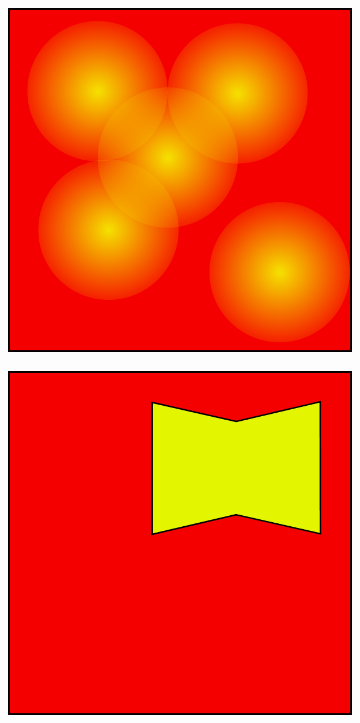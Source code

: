 \begin{figure}[t]
\begin{subfigure}[b]{0.2\textwidth}
      \caption{}
      \label{fig:one-direction-one-candidate}
  \end{subfigure}
  \hfill
  \begin{subfigure}[b]{0.2\textwidth}
      \centering
      \includegraphics[width=\textwidth]{papers/swarm-intelligence2021/img/scenario/standard-overlay.pdf}
      \caption{}
      \label{fig:overlapped}
  \end{subfigure}
  \hfill
  \begin{subfigure}[b]{0.2\textwidth}
      \centering
      \includegraphics[width=\textwidth]{papers/swarm-intelligence2021/img/scenario/non-convex.pdf}

\end{subfigure}
\end{figure}
